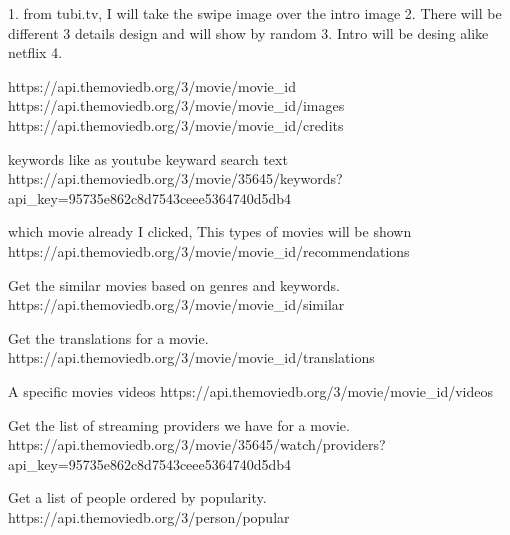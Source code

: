 1. from tubi.tv, I will take the swipe image over the intro image
2. There will be different 3 details design and will show by random
3. Intro will be desing alike netflix
4.

https://api.themoviedb.org/3/movie/{movie_id}
https://api.themoviedb.org/3/movie/{movie_id}/images
https://api.themoviedb.org/3/movie/{movie_id}/credits

keywords like as youtube keyward search text
https://api.themoviedb.org/3/movie/35645/keywords?api_key=95735e862c8d7543ceee5364740d5db4

which movie already I clicked, This types of movies will be shown
https://api.themoviedb.org/3/movie/{movie_id}/recommendations

Get the similar movies based on genres and keywords.
https://api.themoviedb.org/3/movie/{movie_id}/similar

Get the translations for a movie.
https://api.themoviedb.org/3/movie/{movie_id}/translations

A specific movies videos
https://api.themoviedb.org/3/movie/{movie_id}/videos

Get the list of streaming providers we have for a movie.
https://api.themoviedb.org/3/movie/35645/watch/providers?api_key=95735e862c8d7543ceee5364740d5db4

Get a list of people ordered by popularity.
https://api.themoviedb.org/3/person/popular